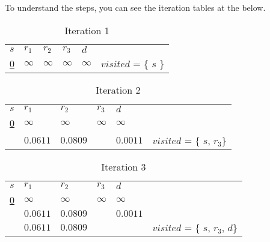\documentclass[conference]{IEEEtran}
\begin{document}
To understand the steps, you can see the iteration tables at the below.

\begin{table}[!htbp]
\caption{Iteration 1}
\begin{tabular}{|l|l|l|l|l|l}
\cline{1-5}
     $s$ & $r_1$    & $r_2$    & $r_3$    & $d$      &                       \\ \cline{1-5}
  {\ul 0}  & $\infty$ & $\infty$ & $\infty$ & $\infty$ & $visited$ = \{ $s$ \} \\ \cline{1-5}
\end{tabular}
\end{table}


\begin{table}[!htbp]
\caption{Iteration 2}
\begin{tabular}{|l|l|l|l|l|l}
\cline{1-5}
$s$ & $r_1$    & $r_2$    & $r_3$            & $d$      &                             \\ \cline{1-5}
{\ul 0}   & $\infty$ & $\infty$ & $\infty$         & $\infty$ &                             \\ \cline{1-5}
    & $0.0611$ & $0.0809$ & {\ul $0.000541$} & $0.0011$ & $visited$ = \{ $s$, $r_3$\} \\ \cline{1-5}
\end{tabular}
\end{table}


\begin{table}[!htbp]
\caption{Iteration 3}
\begin{tabular}{|l|l|l|l|l|l}
\cline{1-5}
$s$     & $r_1$    & $r_2$    & $r_3$            & $d$            &                                  \\ \cline{1-5}
{\ul 0} & $\infty$ & $\infty$ & $\infty$         & $\infty$       &                                  \\ \cline{1-5}
        & $0.0611$ & $0.0809$ & {\ul $0.000541$} & $0.0011$       &                                  \\ \cline{1-5}
        & $0.0611$ & $0.0809$ &                  & {\ul $0.0011$} & $visited$ = \{ $s$, $r_3$, $d$\} \\ \cline{1-5}
\end{tabular}
\end{table}
\end{document}
